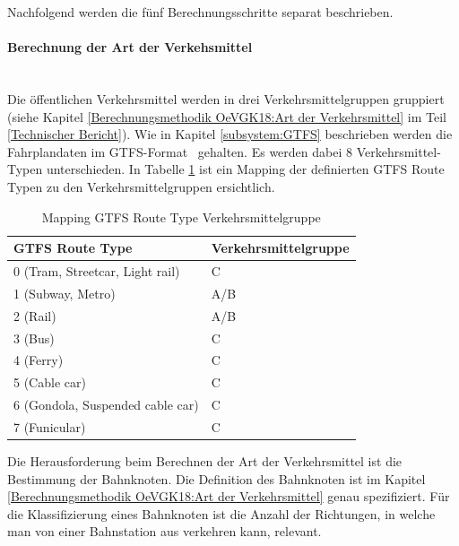 Nachfolgend werden die fünf Berechnungsschritte separat beschrieben.

\paragraph{Berechnung der Art der Verkehsmittel}~\\
Die öffentlichen Verkehrsmittel werden in drei Verkehrsmittelgruppen gruppiert (siehe Kapitel \ref{Berechnungsmethodik OeVGK18:Art der Verkehrsmittel} im Teil \ref{Technischer Bericht}).
Wie in Kapitel \ref{subsystem:GTFS} beschrieben werden die Fahrplandaten im \acs{GTFS}-Format~\cite{gtfs_spec} gehalten. 
Es werden dabei 8 Verkehrsmittel-Typen unterschieden.
In Tabelle \ref{table:Mapping GTFS Route Type Verkehrsmittelgruppe} ist ein Mapping der definierten GTFS Route Typen zu den Verkehrsmittelgruppen ersichtlich.

\begin{table}[ht]
    \centering
    \begin{tabular}[ht]{l l}
        \toprule
        \textbf{GTFS Route Type} 
                                & \textbf{Verkehrsmittelgruppe}\\
        \midrule
        0 (Tram, Streetcar, Light rail)
                                & C\\
        1 (Subway, Metro)
                                & A/B\\
        2 (Rail)
                                & A/B\\
        3 (Bus)
                                & C\\
        4 (Ferry)
                                & C\\
        5 (Cable car)
                                & C\\
        6 (Gondola, Suspended cable car)
                                & C\\
        7 (Funicular)
                                & C\\            
        \bottomrule
    \end{tabular}
    \caption{Mapping GTFS Route Type Verkehrsmittelgruppe}
    \label{table:Mapping GTFS Route Type Verkehrsmittelgruppe}
\end{table}

Die Herausforderung beim Berechnen der Art der Verkehrsmittel ist die Bestimmung der Bahnknoten.
Die Definition des Bahnknoten ist im Kapitel \ref{Berechnungsmethodik OeVGK18:Art der Verkehrsmittel} genau spezifiziert.
Für die Klassifizierung eines Bahnknoten ist die Anzahl der Richtungen, in welche man von einer Bahnstation aus verkehren kann, relevant.

